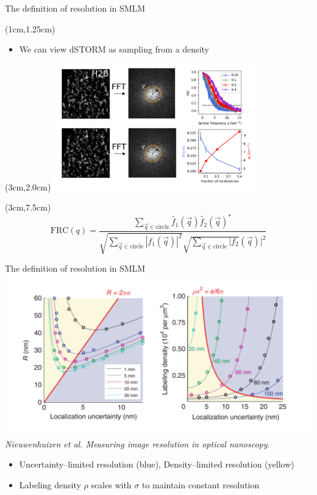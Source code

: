 \documentclass{beamer}					%
\begin{document}
\begin{frame}{The definition of resolution in SMLM}
\begin{textblock*}{13cm}(1cm,1.25cm)
\begin{itemize}
\item We can view dSTORM as sampling from a density
\end{itemize}
\end{textblock*}
\begin{textblock*}{9cm}(3cm,2.0cm)
\includegraphics[width=9cm]{FRC.png}
\end{textblock*}
\begin{textblock*}{8cm}(3cm,7.5cm)
\begin{equation*}
\mathrm{FRC}(q) = \frac{\sum_{\vec{q}\in\mathrm{circle}}\tilde{f_{1}}(\vec{q})\tilde{f_{2}}(\vec{q})^{*}}{\sqrt{\sum_{\vec{q}\in\mathrm{circle}}|f_{1}(\vec{q})|^{2}}\sqrt{\sum_{\vec{q}\in\mathrm{circle}}|f_{2}}(\vec{q})|^{2}}
\end{equation*}
\end{textblock*}
\end{frame}

\begin{frame}{The definition of resolution in SMLM}
\includegraphics[width=\textwidth]{Spatial.png}
\vspace{0.025in}
\textit{Nieuwenhuizen et al. Measuring image resolution in optical nanoscopy.}
\vspace{0.05in}
\begin{itemize}
\item Uncertainty–limited resolution (blue), Density–limited resolution (yellow)
\item Labeling density $\rho$ scales with $\sigma$ to maintain constant resolution
\end{itemize}

\end{frame}
\end{document}
